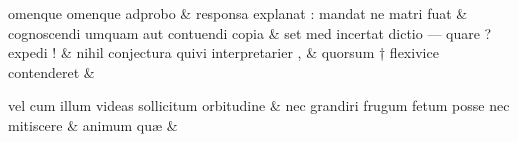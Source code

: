 \documentclass[12pt,onecolumn,twoside,a4paper]{memoir}
\begin{document}
\begin{pairs}
\begin{Leftside}
                              omenque
                              {omenque}
                              adprobo \&
                         \stanza {}responsa
                              explanat
                              :
                              mandat
                              ne
                              matri
                              fuat & 
                     cognoscendi
                              umquam
                              aut
                              contuendi
                              copia \&
                         \stanza {}
                     set
                              med
                              incertat
                              dictio
                              —
                              quare
                              ?
                              expedi
                              ! \&
                         \stanza {}nihil
                              conjectura
                              quivi
                              interpretarier
                              , & 
                     quorsum
                              †
                              flexivice
                              contenderet \&
                         \stanza {}
                     
                              vel
                              cum
                              illum
                              videas
                              sollicitum
                              orbitudine \&
                         \stanza {}
                     nec
                              grandiri
                              frugum
                              fetum
                              posse
                              nec
                              mitiscere \&
                         \stanza {}
                     animum
                              quæ \&
                     

\end{Leftside}
\end{pairs}
\end{document}
